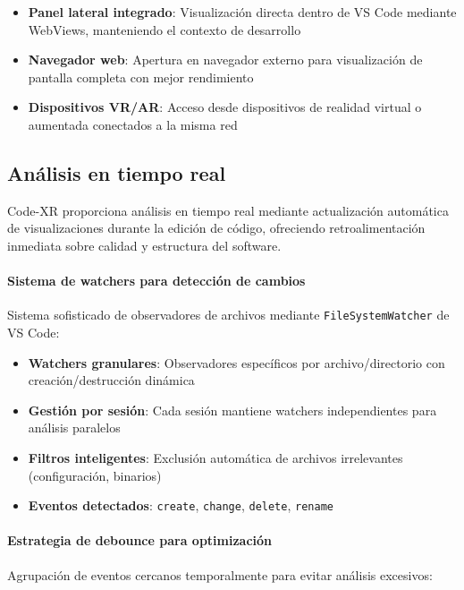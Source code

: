 \documentclass[a4paper, 12pt]{book}
\begin{document}
\begin{itemize}
  \item \textbf{Panel lateral integrado}: Visualización directa dentro de VS Code mediante WebViews, manteniendo el contexto de desarrollo
  \item \textbf{Navegador web}: Apertura en navegador externo para visualización de pantalla completa con mejor rendimiento
  \item \textbf{Dispositivos VR/AR}: Acceso desde dispositivos de realidad virtual o aumentada conectados a la misma red
\end{itemize}


\subsection{Análisis en tiempo real}
\label{sec:analisis-tiempo-real}

Code-XR proporciona análisis en tiempo real mediante actualización automática de visualizaciones durante la edición de código, ofreciendo retroalimentación inmediata sobre calidad y estructura del software.

\paragraph{Sistema de watchers para detección de cambios}
Sistema sofisticado de observadores de archivos mediante \texttt{FileSystemWatcher} de VS Code:

\begin{itemize}
  \item \textbf{Watchers granulares}: Observadores específicos por archivo/directorio con creación/destrucción dinámica
  \item \textbf{Gestión por sesión}: Cada sesión mantiene watchers independientes para análisis paralelos
  \item \textbf{Filtros inteligentes}: Exclusión automática de archivos irrelevantes (configuración, binarios)
  \item \textbf{Eventos detectados}: \texttt{create}, \texttt{change}, \texttt{delete}, \texttt{rename}
\end{itemize}

\paragraph{Estrategia de debounce para optimización}
Agrupación de eventos cercanos temporalmente para evitar análisis excesivos:
\end{document}

